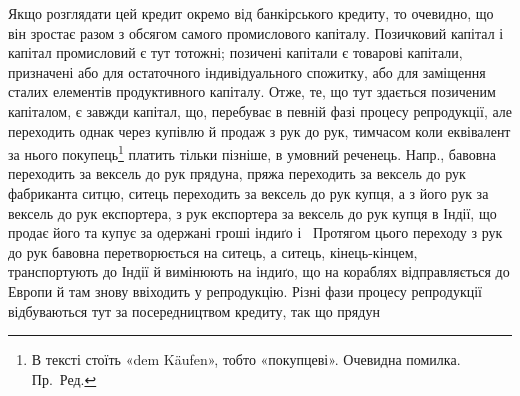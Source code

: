 Якщо розглядати цей кредит окремо від банкірського кредиту, то очевидно,
що він зростає разом з обсягом самого промислового капіталу. Позичковий капітал
і капітал промисловий є тут тотожні; позичені капітали є товарові капітали,
призначені або для остаточного індивідуального спожитку, або для заміщення
сталих елементів продуктивного капіталу. Отже, те, що тут здається
позиченим капіталом, є завжди капітал, що, перебуває в певній фазі процесу репродукції,
але переходить однак через купівлю й продаж з рук до рук, тимчасом
коли еквівалент за нього покупець\footnote*{
В тексті стоїть «dem Käufen», тобто «покупцеві». Очевидна помилка. Пр.~Ред.
} платить тільки пізніше, в умовний реченець.
Напр., бавовна переходить за вексель до рук прядуна, пряжа переходить за
вексель до рук фабриканта ситцю, ситець переходить за вексель до рук купця,
а з його рук за вексель до рук експортера, з рук експортера за вексель до рук
купця в Індії, що продає його та купує за одержані гроші індиґо і~ Протягом
цього переходу з рук до рук бавовна перетворюється на ситець, а ситець,
кінець-кінцем, транспортують до Індії й вимінюють на індиґо, що на кораблях
відправляється до Европи й там знову ввіходить у репродукцію. Різні фази процесу
репродукції відбуваються тут за посередництвом кредиту, так що прядун
\parbreak{}  %
